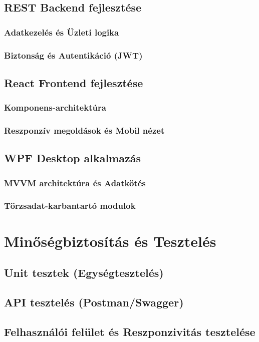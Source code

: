 \documentclass[colorlinks]{thesis-kando}
\theoremstyle{definition}
\theoremstyle{remark}
\begin{document}
\section{REST Backend fejlesztése}
\subsection{Adatkezelés és Üzleti logika}
\subsection{Biztonság és Autentikáció (JWT)}
\section{React Frontend fejlesztése}
\subsection{Komponens-architektúra}
\subsection{Reszponzív megoldások és Mobil nézet}
\section{WPF Desktop alkalmazás}
\subsection{MVVM architektúra és Adatkötés}
\subsection{Törzsadat-karbantartó modulok}

\chapter{Minőségbiztosítás és Tesztelés}
\section{Unit tesztek (Egységtesztelés)}
\section{API tesztelés (Postman/Swagger)}
\section{Felhasználói felület és Reszponzivitás tesztelése}
\end{document}

